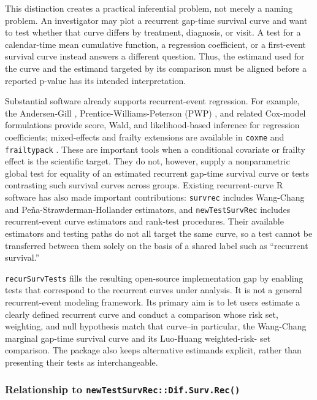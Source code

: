 \documentclass[
  12pt]{article}
\begin{document}
This distinction creates a practical inferential problem, not merely a
naming problem. An investigator may plot a recurrent gap-time survival
curve and want to test whether that curve differs by treatment,
diagnosis, or visit. A test for a calendar-time mean cumulative
function, a regression coefficient, or a first-event survival curve
instead answers a different question. Thus, the estimand used for the
curve and the estimand targeted by its comparison must be aligned before
a reported p-value has its intended interpretation.

Substantial software already supports recurrent-event regression. For
example, the Andersen-Gill \citep{andersen1982},
Prentice-Williams-Peterson (PWP) \citep{prentice1981}, and related
Cox-model formulations provide score, Wald, and likelihood-based
inference for regression coefficients; mixed-effects and frailty
extensions are available in \texttt{coxme} \citep{coxme} and
\texttt{frailtypack} \citep{frailtypack}. These are important tools when
a conditional covariate or frailty effect is the scientific target. They
do not, however, supply a nonparametric global test for equality of an
estimated recurrent gap-time survival curve or tests contrasting such
survival curves across groups. Existing recurrent-curve R software has
also made important contributions: \texttt{survrec} \citep{survrec}
includes Wang-Chang and Peña-Strawderman-Hollander estimators, and
\texttt{newTestSurvRec} \citep{newtestsurvrec} includes recurrent-event
curve estimators and rank-test procedures. Their available estimators
and testing paths do not all target the same curve, so a test cannot be
transferred between them solely on the basis of a shared label such as
``recurrent survival.''

\texttt{recurSurvTests} fills the resulting open-source implementation
gap by enabling tests that correspond to the recurrent curves under
analysis. It is not a general recurrent-event modeling framework. Its
primary aim is to let users estimate a clearly defined recurrent curve
and conduct a comparison whose risk set, weighting, and null hypothesis
match that curve--in particular, the Wang-Chang marginal gap-time
survival curve and its Luo-Huang weighted-risk- set comparison. The
package also keeps alternative estimands explicit, rather than
presenting their tests as interchangeable.

\subsubsection{\texorpdfstring{Relationship to
\texttt{newTestSurvRec::Dif.Surv.Rec()}}{Relationship to newTestSurvRec::Dif.Surv.Rec()}}\label{relationship-to-newtestsurvrecdif.surv.rec}
\end{document}
